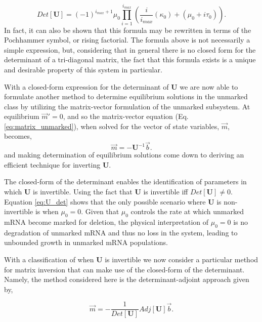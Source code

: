 \documentclass[review]{elsarticle}
\let\bs\boldsymbol
\begin{document}
\begin{equation}\label{eq:U_det}
Det[\bs{U}]=(-1)^{i_{max}+1}\mu_0\prod_{i=1}^{i_{max}}{\left(\frac{i}{i_{max}}(\kappa_0)+(\mu_0+i\tau_0)\right)}.
\end{equation}
In fact, it can also be shown that this formula may be rewritten in terms of the Pochhammer symbol, or rising factorial. The formula above is not necessarily a simple expression, but, considering that in general there is no closed form for the determinant of a tri-diagonal matrix, the fact that this formula exists is a unique and desirable property of this system in particular.

With a closed-form expression for the determinant of $\bs{U}$ we are now able to formulate another method to determine equilibrium solutions in the unmarked class by utilizing the matrix-vector formulation of the unmarked subsystem.  At equilibrium $\vec{m}'=0$, and so the matrix-vector equation (Eq. \ref{eq:matrix_unmarked}), when solved for the vector of state variables, $\vec{m}$, becomes,
\begin{equation}
\vec{m}=-\bs{U}^{-1}\vec{b}.
\end{equation}
and making determination of equilibrium solutions come down to deriving an efficient technique for inverting $\bs{U}$.  

The closed-form of the determinant enables the identification of parameters in which $\bs{U}$ is invertible.  Using the fact that $\bs{U}$ is invertible iff $Det[\bs{U}]\neq0$.  Equation \ref{eq:U_det} shows that the only possible scenario where $\bs{U}$ is non-invertible is when $\mu_0=0$.  Given that $\mu_0$ controls the rate at which unmarked mRNA become marked for deletion, the physical interpretation of $\mu_0=0$ is no degradation of unmarked mRNA and thus no loss in the system, leading to unbounded growth in unmarked mRNA populations.

With a classification of when $\bs{U}$ is invertible we now consider a particular method for matrix inversion that can make use of the closed-form of the determinant. Namely, the method considered here is the determinant-adjoint approach given by,

\begin{equation*}
\vec{m}=-\frac{1}{Det[\bs{U}]}Adj[\bs{U}]\vec{b}.
\end{equation*}
\end{document}
